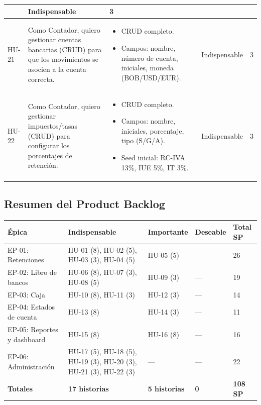 \documentclass[stu]{apa7}
\begin{document}
\begin{longtable}{|L{0.8cm}|L{4.5cm}|L{3.5cm}|L{2cm}|L{1.5cm}|}
\begin{itemize}[nosep]
\end{itemize} & Indispensable & 3 \\
\hline
HU-21 & Como Contador, quiero gestionar cuentas bancarias (CRUD) para que los movimientos se asocien a la cuenta correcta. & 
\begin{itemize}[nosep]
    \item CRUD completo.
    \item Campos: nombre, número de cuenta, iniciales, moneda (BOB/USD/EUR).
\end{itemize} & Indispensable & 3 \\
\hline
HU-22 & Como Contador, quiero gestionar impuestos/tasas (CRUD) para configurar los porcentajes de retención. & 
\begin{itemize}[nosep]
    \item CRUD completo.
    \item Campos: nombre, iniciales, porcentaje, tipo (S/G/A).
    \item Seed inicial: RC-IVA 13\%, IUE 5\%, IT 3\%.
\end{itemize} & Indispensable & 3 \\
\hline
\end{longtable}

\newpage

\subsection{Resumen del Product Backlog}

\begin{longtable}{|L{2cm}|L{3cm}|L{3cm}|L{3cm}|C{2cm}|}
\hline
{}
\textbf{Épica} & \textbf{Indispensable} & \textbf{Importante} & \textbf{Deseable} & \textbf{Total SP} \\
\hline
\endhead
EP-01: Retenciones & HU-01 (8), HU-02 (5), HU-03 (3), HU-04 (5) & HU-05 (5) & --- & 26 \\
\hline
EP-02: Libro de bancos & HU-06 (8), HU-07 (3), HU-08 (5) & HU-09 (3) & --- & 19 \\
\hline
EP-03: Caja & HU-10 (8), HU-11 (3) & HU-12 (3) & --- & 14 \\
\hline
EP-04: Estados de cuenta & HU-13 (8) & HU-14 (3) & --- & 11 \\
\hline
EP-05: Reportes y dashboard & HU-15 (8) & HU-16 (8) & --- & 16 \\
\hline
EP-06: Administración & HU-17 (5), HU-18 (5), HU-19 (3), HU-20 (3), HU-21 (3), HU-22 (3) & --- & --- & 22 \\
\hline
{}
\textbf{Totales} & \textbf{17 historias} & \textbf{5 historias} & \textbf{0} & \textbf{108 SP} \\
\hline
\end{longtable}
\end{document}

